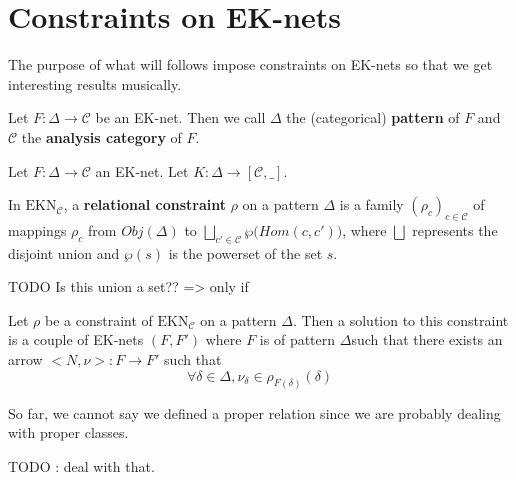 

\section{Constraints on EK-nets}


The purpose of what will follows impose constraints on EK-nets so that we get interesting results musically.

Let $F : \Delta \rightarrow \mathcal{C}$ be an EK-net. Then we call $\Delta$ the (categorical) \textbf{pattern} of $F$ and $\mathcal{C}$ the \textbf{analysis category} of $F$.

\begin{defn}
    Let $F : \Delta \rightarrow\mathcal{C}$ an EK-net. Let $K: \Delta \rightarrow  [\mathcal{C}, \_]$.
\end{defn}

\begin{defn}
    In $\text{EKN}_\mathcal{C}$, a \textbf{relational constraint} $\rho$ on a pattern $\Delta$ is a family 
    $(\rho_c)_{c\in\mathcal{C}}$
    of mappings $\rho_c$ from $Obj(\Delta)$ to 
    $\bigsqcup_{c'\in \mathcal{C}}\wp\big(Hom(c,c')\big)$, where $\bigsqcup$ represents the disjoint union \label{nomencl:sq-cup} and $\wp(s)$ is the powerset of the set $s$\label{nomencl:pow-set}.
\end{defn}

TODO Is this union a set?? => only if 


\begin{defn}
    Let $\rho$ be a constraint of $\text{EKN}_\mathcal{C}$ on a pattern $\Delta$. Then a solution to this constraint is a couple of EK-nets $(F,F')$ where $F$ is of pattern $\Delta$such that there exists an arrow $\big<N,\nu\big> : F\rightarrow F'$ such that 
    $$\forall \delta \in \Delta, \nu_\delta \in \rho_{F(\delta)}(\delta)$$
\end{defn}

\begin{rem}
    So far, we cannot say we defined a proper relation since we are probably dealing with proper classes.

    TODO : deal with that.
\end{rem}



